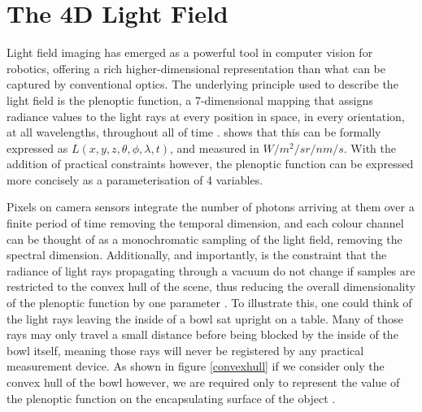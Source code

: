 \documentclass[openany]{book}
\begin{document}
\section{The 4D Light Field}
Light field imaging has emerged as a powerful tool in computer vision for robotics, offering a rich higher-dimensional representation than what can be captured by conventional optics. The underlying principle used to describe the light field is the plenoptic function, a 7-dimensional mapping that assigns radiance values to the light rays at every position in space, in every orientation, at all wavelengths, throughout all of time \cite{ihrke2016lfprinciples}. \cite{adelson1991plenoptic} shows that this can be formally expressed as $L(x,y,z,\theta, \phi, \lambda, t)$, and measured in $W/m^2/sr/nm/s$. 
With the addition of practical constraints however, the plenoptic function can be expressed more concisely as a parameterisation of 4 variables. 

Pixels on camera sensors integrate the number of photons arriving at them over a finite period of time removing the temporal dimension, and each colour channel can be thought of as a monochromatic sampling of the light field, removing the spectral dimension. Additionally, and importantly, is the constraint that the radiance of light rays propagating through a vacuum do not change if samples are restricted to the convex hull of the scene, thus reducing the overall dimensionality of the plenoptic function by one parameter \cite{levoy1996lfrendering}. To illustrate this, one could think of the light rays leaving the inside of a bowl sat upright on a table. Many of those rays may only travel a small distance before being blocked by the inside of the bowl itself, meaning those rays will never be registered by any practical measurement device. As shown in figure \ref{convexhull} if we consider only the convex hull of the bowl however, we are required only to represent the value of the plenoptic function on the encapsulating surface of the object \cite{gortler1996lumigraph}.
\end{document}
